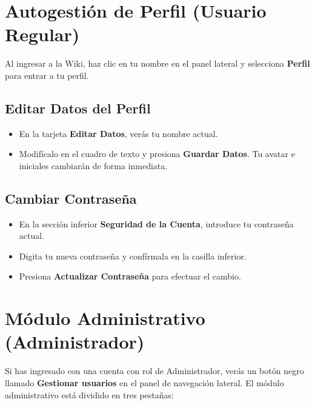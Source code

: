 \documentclass[11pt,a4paper]{article}
\begin{document}
\section{Autogestión de Perfil (Usuario Regular)}
Al ingresar a la Wiki, haz clic en tu nombre en el panel lateral y selecciona \textbf{Perfil} para entrar a tu perfil.

\subsection{Editar Datos del Perfil}
\begin{itemize}
    \item En la tarjeta \textbf{Editar Datos}, verás tu nombre actual.
    \item Modifícalo en el cuadro de texto y presiona \textbf{Guardar Datos}. Tu avatar e iniciales cambiarán de forma inmediata.
\end{itemize}

\subsection{Cambiar Contraseña}
\begin{itemize}
    \item En la sección inferior \textbf{Seguridad de la Cuenta}, introduce tu contraseña actual.
    \item Digita tu nueva contraseña y confírmala en la casilla inferior.
    \item Presiona \textbf{Actualizar Contraseña} para efectuar el cambio.
\end{itemize}

\section{Módulo Administrativo (Administrador)}
Si has ingresado con una cuenta con rol de Administrador, verás un botón negro llamado \textbf{Gestionar usuarios} en el panel de navegación lateral. El módulo administrativo está dividido en tres pestañas:
\end{document}
